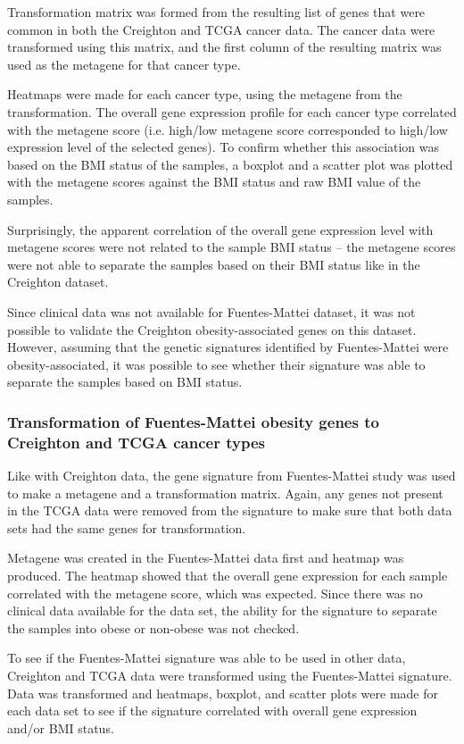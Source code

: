 \documentclass[a4paper, 11pt]{article}
\begin{document}
Transformation matrix was formed from the resulting list of genes that were common in both the Creighton and TCGA cancer data.
The cancer data were transformed using this matrix, and the first column of the resulting matrix was used as the metagene for that cancer type.

Heatmaps were made for each cancer type, using the metagene from the transformation.
The overall gene expression profile for each cancer type correlated with the metagene score (i.e. high/low metagene score corresponded to high/low expression level of the selected genes).
To confirm whether this association was based on the BMI status of the samples, a boxplot and a scatter plot was plotted with the metagene scores against the BMI status and raw BMI value of the samples.

Surprisingly, the apparent correlation of the overall gene expression level with metagene scores were not related to the sample BMI status -- the metagene scores were not able to separate the samples based on their BMI status like in the Creighton dataset.

Since clinical data was not available  for Fuentes-Mattei  dataset, it was not possible to validate the Creighton obesity-associated genes on this dataset.
However, assuming that the genetic signatures identified by Fuentes-Mattei were obesity-associated, it was possible to see whether their signature was able to separate the samples based on BMI status.

\subsubsection*{Transformation of Fuentes-Mattei obesity genes to Creighton and TCGA cancer types}

Like with Creighton data, the gene signature from Fuentes-Mattei study was used to make a metagene and a transformation matrix.
Again, any genes not present in the TCGA data were removed from the signature to make sure that both data sets had the same genes for transformation.

Metagene was created in the Fuentes-Mattei data first and heatmap was produced.
The heatmap showed that the overall gene expression for each sample correlated with the metagene score, which was expected.
Since there was no clinical data available for the data set, the ability for the signature to separate the samples into obese or non-obese was not checked.

To see if the Fuentes-Mattei signature was able to be used in other data, Creighton and TCGA data were transformed using the Fuentes-Mattei signature.
Data was transformed and heatmaps, boxplot, and scatter plots were made for each data set to see if the signature correlated with overall gene expression and/or BMI status.
\end{document}

